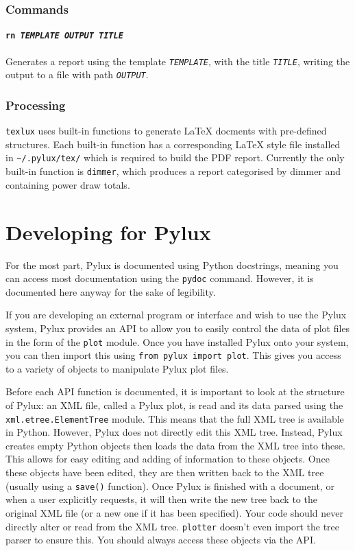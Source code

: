 \documentclass[a4paper]{article}
\begin{document}
\subsubsection{Commands}

\paragraph{\texttt{rn \textit{TEMPLATE OUTPUT TITLE}}}
Generates a report using the template \texttt{\textit{TEMPLATE}}, with the 
title \texttt{\textit{TITLE}}, writing the output to a file with path 
\texttt{\textit{OUTPUT}}.

\subsubsection{Processing}

\texttt{texlux} uses built-in functions to generate \LaTeX{} docments with 
pre-defined structures. Each built-in function has a corresponding \LaTeX{} 
style file installed in \texttt{\~{}/.pylux/tex/} which is required to build the 
PDF report. Currently the only built-in function is \texttt{dimmer}, which 
produces a report categorised by dimmer and containing power draw totals.

\section{Developing for Pylux}
For the most part, Pylux is documented using Python docstrings, meaning you 
can access most documentation using the \texttt{pydoc} command. However, it 
is documented here anyway for the sake of legibility.

If you are developing an external program or interface and wish to use the 
Pylux system, Pylux provides an API to allow you to easily control the data of 
plot files in the form of the \texttt{plot} module. Once you have installed 
Pylux onto your system, you can then import this using 
\texttt{from pylux import plot}. This gives you access to a variety of 
objects to manipulate Pylux plot files.

Before each API function is documented, it is important to look at the 
structure of Pylux: an XML file, called a Pylux plot, is read and its data 
parsed using the \texttt{xml.etree.ElementTree} module. This means that the 
full XML tree is available in Python. However, Pylux does not directly edit 
this XML tree. Instead, Pylux creates empty Python objects then loads the 
data from the XML tree into these. This allows for easy editing and adding of 
information to these objects. Once these objects have been edited, they are 
then written back to the XML tree (usually using a \texttt{save()} function). 
Once Pylux is finished with a document, or when a user explicitly requests, 
it will then write the new tree back to the original XML file (or a new one if 
it has been specified). Your code should never directly alter or read from 
the XML tree. \texttt{plotter} doesn't even import the tree parser to ensure 
this. You should always access these objects via the API.
\end{document}
